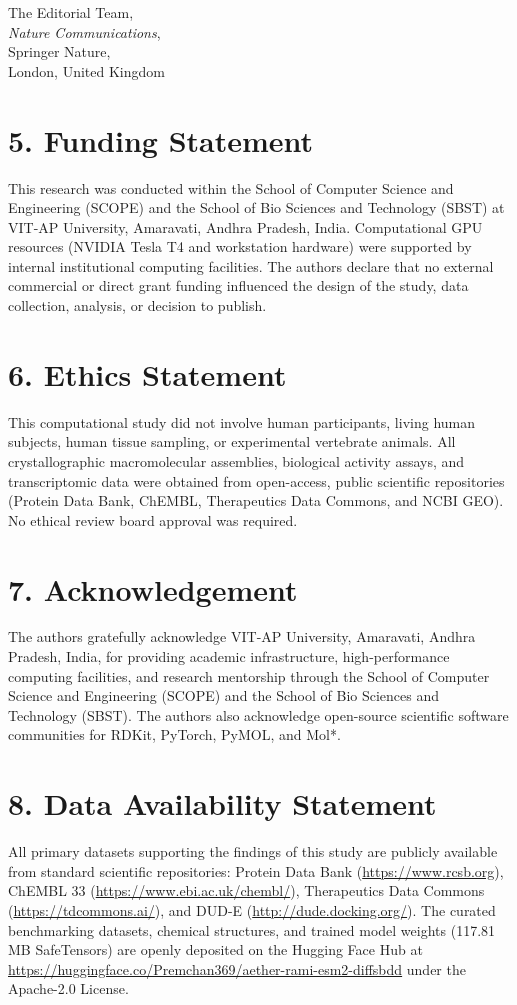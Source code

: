 \documentclass[11pt]{letter}
\begin{document}
\begin{letter}{%
    The Editorial Team,\\
    \textit{Nature Communications},\\
    Springer Nature,\\
    London, United Kingdom
}
\section*{5. Funding Statement}
This research was conducted within the School of Computer Science and Engineering (SCOPE) and the School of Bio Sciences and Technology (SBST) at VIT-AP University, Amaravati, Andhra Pradesh, India. Computational GPU resources (NVIDIA Tesla T4 and workstation hardware) were supported by internal institutional computing facilities. The authors declare that no external commercial or direct grant funding influenced the design of the study, data collection, analysis, or decision to publish.

\section*{6. Ethics Statement}
This computational study did not involve human participants, living human subjects, human tissue sampling, or experimental vertebrate animals. All crystallographic macromolecular assemblies, biological activity assays, and transcriptomic data were obtained from open-access, public scientific repositories (Protein Data Bank, ChEMBL, Therapeutics Data Commons, and NCBI GEO). No ethical review board approval was required.

\section*{7. Acknowledgement}
The authors gratefully acknowledge VIT-AP University, Amaravati, Andhra Pradesh, India, for providing academic infrastructure, high-performance computing facilities, and research mentorship through the School of Computer Science and Engineering (SCOPE) and the School of Bio Sciences and Technology (SBST). The authors also acknowledge open-source scientific software communities for RDKit, PyTorch, PyMOL, and Mol*.

\section*{8. Data Availability Statement}
All primary datasets supporting the findings of this study are publicly available from standard scientific repositories: Protein Data Bank (\url{https://www.rcsb.org}), ChEMBL 33 (\url{https://www.ebi.ac.uk/chembl/}), Therapeutics Data Commons (\url{https://tdcommons.ai/}), and DUD-E (\url{http://dude.docking.org/}). The curated benchmarking datasets, chemical structures, and trained model weights (117.81\,MB SafeTensors) are openly deposited on the Hugging Face Hub at \url{https://huggingface.co/Premchan369/aether-rami-esm2-diffsbdd} under the Apache-2.0 License.


\end{letter}
\end{document}
